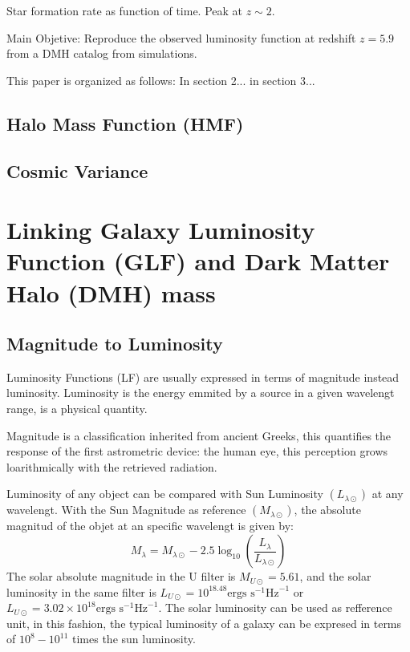 \documentclass{emulateapj}
\begin{document}
Star formation rate as function of time. Peak at $z\sim 2$.






Main Objetive: Reproduce the observed luminosity function at redshift $z=5.9$
from a DMH catalog from simulations. 

This paper is organized as follows: In section 2... in section 3...

  \subsection{Halo Mass Function (HMF)}


  
  
  
  \subsection{Cosmic Variance}
  

\section{Linking Galaxy Luminosity Function (GLF) and
  Dark Matter Halo (DMH) mass}

\subsection{Magnitude to Luminosity}

Luminosity Functions (LF) are usually expressed in terms of magnitude instead 
luminosity. Luminosity is the energy emmited by a source in a given wavelengt range, 
is a physical quantity. 


Magnitude is a classification inherited from ancient Greeks, this
quantifies the response of the first astrometric device: the human eye, this
perception grows loarithmically with the retrieved radiation.

Luminosity of any object can be compared with Sun Luminosity $(L_{\lambda
\odot})$ at any wavelengt. With the Sun Magnitude as reference
$(M_{\lambda \odot})$, the absolute magnitud of the objet  at an specific
wavelengt is given by: 
 \[ M_{\lambda} = M_{\lambda \odot} - 2.5 \log_{10}\left( 
\frac{L_\lambda}{L_{\lambda \odot}} \right) \]
  The solar absolute magnitude in the U filter is $M_{U\odot} = 5.61$,
and the solar luminosity in the same filter is $L_{U\odot} = 10^{18.48} 
\textrm{ergs s}^{-1}\textrm{Hz}^{-1}$ or $ L_{U\odot} = 3.02 \times 10^{18} 
\textrm{ergs s}^{-1}\textrm{Hz}^{-1}$. The solar luminosity can be used as
refference unit, in this fashion, the typical luminosity of a galaxy can be expresed in
terms of $10^{8}-10^{11}$ times the sun luminosity.
\end{document}
